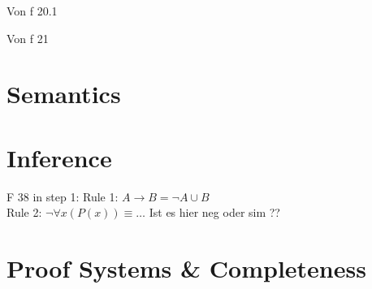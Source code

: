 

\begin{bsp}
    Von f 20.1
\end{bsp}




\begin{bsp}
    Von f 21
\end{bsp}




\section{Semantics}\label{sec:semantics}






\section{Inference}\label{sec:inference}





F 38 in step 1: Rule 1: $A \rightarrow B = \neg A \cup B$ \\ Rule 2: $\neg \forall x (P(x)) \equiv \dots$ Ist es hier
neg oder sim ??







\section{Proof Systems \& Completeness}\label{sec:proof-systems-&-completeness}



